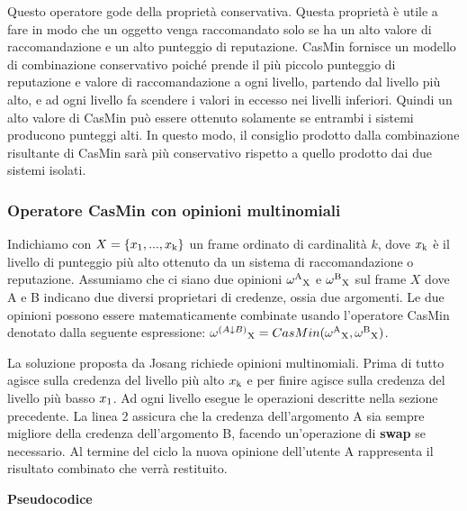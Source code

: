 \documentclass[letterpaper]{article} %
\begin{document}
Questo operatore gode della proprietà conservativa. Questa proprietà è
utile a fare in modo che un oggetto venga raccomandato solo se ha un
alto valore di raccomandazione e un alto punteggio di reputazione.
CasMin fornisce un modello di combinazione conservativo poiché prende il
più piccolo punteggio di reputazione e valore di raccomandazione a ogni
livello, partendo dal livello più alto, e ad ogni livello fa scendere i
valori in eccesso nei livelli inferiori. Quindi un alto valore di CasMin
può essere ottenuto solamente se entrambi i sistemi producono punteggi
alti. In questo modo, il consiglio prodotto dalla combinazione
risultante di CasMin sarà più conservativo rispetto a quello prodotto
dai due sistemi isolati.

\subsubsection{Operatore CasMin con opinioni multinomiali}

Indichiamo con $X=\{x\textsubscript{1} ,...,x\textsubscript{k}\}$ un frame
ordinato di cardinalità $k$, dove $x\textsubscript{k}$ è il livello di punteggio più alto
ottenuto da un sistema di raccomandazione o reputazione. Assumiamo che
ci siano due opinioni $\omega\textsuperscript{A}\textsubscript{X}$ e $\omega\textsuperscript{B}\textsubscript{X}$ sul frame $X$ dove A e B indicano
due diversi proprietari di credenze, ossia due argomenti. Le due
opinioni possono essere matematicamente combinate usando l'operatore
CasMin denotato dalla seguente espressione: $\omega^{(A \downarrow B)}\textsubscript{X}=CasMin(\omega\textsuperscript{A}\textsubscript{X}, \omega\textsuperscript{B}\textsubscript{X})$.

La soluzione proposta da Josang richiede opinioni multinomiali. Prima di
tutto agisce sulla credenza del livello più alto $x\textsubscript{k}$ e per finire agisce
sulla credenza del livello più basso $x\textsubscript{1}$. Ad ogni livello esegue le
operazioni descritte nella sezione precedente. La linea 2 assicura che
la credenza dell'argomento A sia sempre migliore della credenza
dell'argomento B, facendo un'operazione di \textbf{swap} se necessario. Al
termine del ciclo la nuova opinione dell'utente A rappresenta il
risultato combinato che verrà restituito.

\textbf{Pseudocodice}
\end{document}
